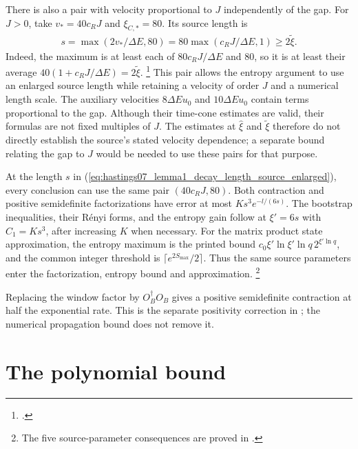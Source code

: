 \documentclass{article}
\begin{document}
There is also a pair with velocity proportional to $J$ independently of
the gap. For $J>0$, take $v_*=40c_RJ$ and $\xi_{C,*}=80$. Its source
length is
\begin{align}
    s=\max(2v_*/\Delta E,80)
      =80\max(c_RJ/\Delta E,1)\ge2\tilde\xi.
    \label{eq:hastings07_lemma1_decay_length_source_enlarged}
\end{align}
Indeed, the maximum is at least each of $80c_RJ/\Delta E$ and $80$,
so it is at least their average $40(1+c_RJ/\Delta E)=2\tilde\xi$.%
\footnote{.}
This pair allows the entropy argument to use an enlarged source length
while retaining a velocity of order $J$ and a numerical length scale.
The auxiliary velocities $8\Delta E u_0$ and $10\Delta E u_0$ contain
terms proportional to the gap. Although their time-cone estimates are
valid, their formulas are not fixed multiples of $J$. The estimates at
$\hat\xi$ and $\tilde\xi$ therefore do not directly establish the source's
stated velocity dependence; a separate bound relating the gap to $J$
would be needed to use these pairs for that purpose.

At the length $s$ in
(\ref{eq:hastings07_lemma1_decay_length_source_enlarged}), every conclusion
can use the same pair $(40c_RJ,80)$. Both contraction and positive
semidefinite factorizations have error at most
$Ks^3e^{-l/(6s)}$. The bootstrap inequalities, their Rényi forms, and the
entropy gain follow at $\xi'=6s$ with $C_1=Ks^3$, after increasing $K$
when necessary. For the matrix product state approximation, the entropy
maximum is the printed bound
$c_0\xi'\ln\xi'\ln q\,2^{\xi'\ln q}$, and the common integer threshold is
$\lceil e^{2S_{\max}}/2\rceil$. Thus the same source parameters enter the
factorization, entropy bound and approximation.
\footnote{The five source-parameter consequences are proved in
    .}


Replacing the window factor by $O_B^\dagger O_B$ gives a positive
semidefinite contraction at half the exponential rate. This is the
separate positivity correction in
; the numerical propagation
bound does not remove it.

\section{The polynomial bound}
\end{document}
